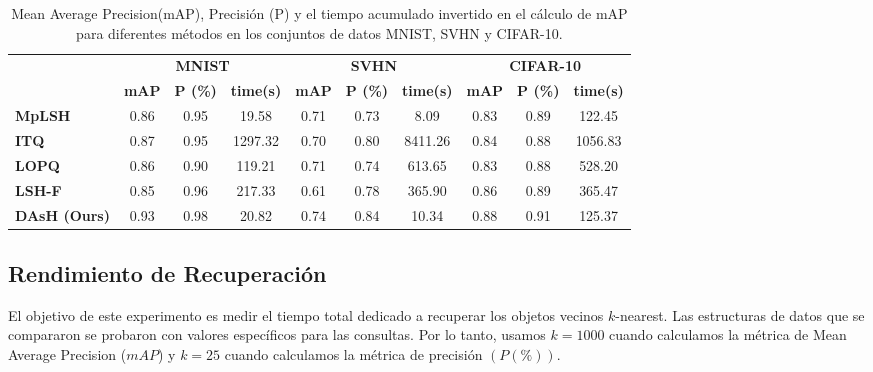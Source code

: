 \begin{table}[!htp]
\caption{Mean Average Precision(mAP), Precisión (P) y el tiempo acumulado invertido en el cálculo de mAP para diferentes métodos en los conjuntos de datos MNIST, SVHN y CIFAR-10. }
\label{table:map}
\centering
\begin{footnotesize}
\begin{tabular}{l|c|c|c|c|c|c|c|c|c|}
\cline{2-10}
                                           & \multicolumn{3}{c|}{\textbf{MNIST}}            & \multicolumn{3}{c|}{\textbf{SVHN}}             & \multicolumn{3}{c|}{\textbf{CIFAR-10}}         \\ \cline{2-10} 
                                           & \textbf{mAP} & \textbf{P (\%)} & \textbf{time(s)} & \textbf{mAP} & \textbf{P (\%)} & \textbf{time(s)} & \textbf{mAP} & \textbf{P (\%)} & \textbf{time(s)} \\ \hline
\multicolumn{1}{|l|}{\textbf{MpLSH  }}       & 0.86         & 0.95            & \cellcolor[HTML]{c8c8c8}19.58         & 0.71         & 0.73            & 8.09          & \cellcolor[HTML]{c8c8c8}0.83         & 0.89            & \cellcolor[HTML]{c8c8c8}122.45        \\ \hline
\multicolumn{1}{|l|}{\textbf{ITQ  }}         & 0.87         & 0.95            & 1297.32       & 0.70         & 0.80            & 8411.26       & 0.84         & 0.88            & 1056.83       \\ \hline
\multicolumn{1}{|l|}{\textbf{LOPQ  }}        & 0.86         & 0.90            & 119.21        & 0.71         & 0.74            & 613.65        & 0.83         & 0.88            & 528.20        \\ \hline
\multicolumn{1}{|l|}{\textbf{LSH-F  }}       & 0.85         & 0.96            & 217.33        & 0.61         & 0.78            & 365.90        & 0.86         & 0.89            & 365.47        \\ \hline
\multicolumn{1}{|l|}{\textbf{DAsH (Ours)}} & \cellcolor[HTML]{c8c8c8}0.93         & \cellcolor[HTML]{c8c8c8}0.98            & \cellcolor[HTML]{f2f2f2}20.82         & \cellcolor[HTML]{c8c8c8}0.74         & \cellcolor[HTML]{c8c8c8}0.84            & \cellcolor[HTML]{f2f2f2}10.34         & \cellcolor[HTML]{c8c8c8}0.88         & \cellcolor[HTML]{c8c8c8}0.91            & \cellcolor[HTML]{f2f2f2}125.37        \\ \hline
\end{tabular}
\end{footnotesize}
\end{table}
\subsection{Rendimiento de Recuperación} %
El objetivo de este experimento es medir el tiempo total dedicado a recuperar los objetos vecinos $k$-nearest. Las estructuras de datos que se compararon se probaron con valores específicos para las consultas. Por lo tanto, usamos $k = 1000$ cuando calculamos la métrica de Mean Average Precision ($mAP$) y $k = 25$ cuando calculamos la métrica de precisión $ (P(\%))$.

